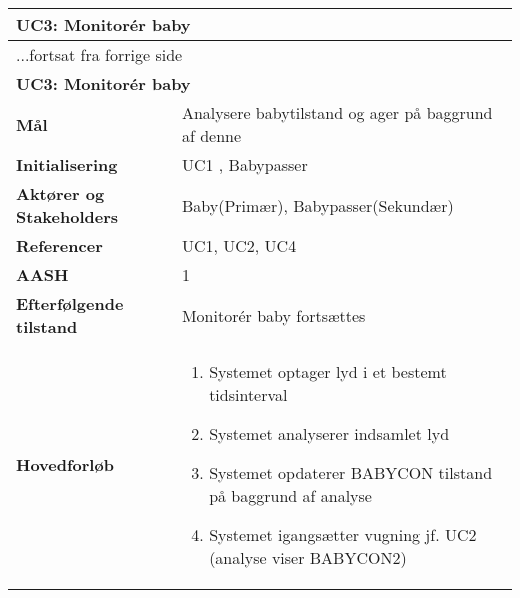 \begin{center} \centering \label{kravspec:uc3}
	\begin{longtable}{|p{5cm}|p{9cm}|}  %
	\hline
		\multicolumn{2}{|l|}{\textbf{UC3: Monitorér baby}} \\\hline %
		\endfirsthead
		
		\multicolumn{2}{l}{...fortsat fra forrige side} \\ \hline %
		\multicolumn{2}{|l|}{\textbf{UC3: Monitorér baby}} \\\hline %
		\endhead	
		
		\textbf{Mål}							&Analysere babytilstand og ager på baggrund af denne	\\\hline
		\textbf{Initialisering}				&UC1	, Babypasser	\\\hline
		\textbf{Aktører og Stakeholders}		&Baby(Primær), Babypasser(Sekundær)		\\\hline 
		\textbf{Referencer}					&UC1, UC2, UC4		\\\hline
		\textbf{AASH}						&1		\\\hline
		\textbf{Efterfølgende tilstand}		&Monitorér baby fortsættes		\\\hline
		\textbf{Hovedforløb}					
			&\begin{enumerate}
					
				\item \label{kravspec:uc3_optagelse}Systemet optager lyd i et bestemt tidsinterval 				
				\newline [Und: \ref{kravspec:uc3_optagelse}.a Ingen optagelse]
				
				\item Systemet analyserer indsamlet lyd 
				
				\item Systemet opdaterer BABYCON tilstand på baggrund af analyse
				
				\item \label{kravspec:uc3_lydanalyse}Systemet igangsætter vugning jf. UC2 (analyse viser BABYCON2)			
				\newline [Und: \ref{kravspec:uc3_lydanalyse}.a Vugning allerede igang (forrige analyse viste BABYCON2)]
				\newline [Und: \ref{kravspec:uc3_lydanalyse}.b Analyse viser BABYCON3 (forrige analyse viste BABYCON2)]
				\newline [Und: \ref{kravspec:uc3_lydanalyse}.c Analyse viser BABYCON3 (forrige analyse viste BABYCON3)]
				\newline [Und: \ref{kravspec:uc3_lydanalyse}.d Analyse viser BABYCON1]
				

\end{enumerate}
\end{longtable}
\end{center}
